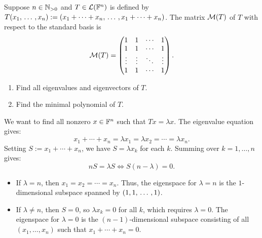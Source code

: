 \begin{xrcs}
  Suppose $n \in \mathbb{N}_{>0}$ and $T \in \mathcal{L}(\mathbb{F}^n)$ is defined by $T(x_1 , {\, \ldots \,\,}, x_n) := (x_1 + \cdots + x_n, {\, \ldots \,\,}, x_1 + \cdots + x_n)$. The matrix $\mathcal{M} (T)$ of $T$ with respect to the standard basis is
  \begin{equation}
    \mathcal{M} (T) =
    \begin{pmatrix}
      1 & 1 & \cdots & 1 \\
      1 & 1 & \cdots & 1 \\
      \vdots & \vdots & \ddots & \vdots \\
      1 & 1 & \cdots & 1
    \end{pmatrix}.
  \end{equation}

  \begin{enumerate}
    \item Find all eigenvalues and eigenvectors of $T$.
    \item Find the minimal polynomial of $T$.
  \end{enumerate}

  \begin{xsol}
    We want to find all nonzero $x \in \mathbb{F}^n$ such that $Tx = \lambda x$. The eigenvalue equation gives:
    \begin{equation}
      x_1 + \cdots + x_n = \lambda x_1 = \lambda x_2 = \cdots = \lambda x_n.
    \end{equation}
    Setting $S := x_1 + \cdots + x_n$, we have $S = \lambda x_k$ for each $k$. Summing over $k=1, \dots, n$ gives:
    \begin{equation}
      nS = \lambda S \iff S(n - \lambda) = 0.
    \end{equation}
    \begin{itemize}
      \item If $\lambda = n$, then $x_1 = x_2 = \cdots = x_n$. Thus, the eigenspace for $\lambda = n$ is the $1$-dimensional subspace spanned by $(1, 1, {\, \ldots \,\,}, 1)$.
      \item If $\lambda \neq n$, then $S = 0$, so $\lambda x_k = 0$ for all $k$, which requires $\lambda = 0$. The eigenspace for $\lambda = 0$ is the $(n-1)$-dimensional subspace consisting of all $(x_1, \dots, x_n)$ such that $x_1 + \cdots + x_n = 0$.
    \end{itemize}


\end{xsol}
\end{xrcs}
